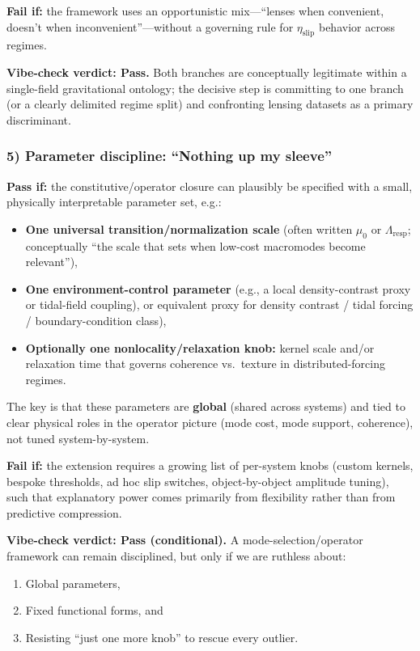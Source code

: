 \textbf{Fail if:} the framework uses an opportunistic mix---``lenses when convenient, doesn't 
when inconvenient''---without a governing rule for $\eta_{\text{slip}}$ behavior across regimes.

\checkmark \textbf{Vibe-check verdict: Pass.} Both branches are conceptually legitimate within 
a single-field gravitational ontology; the decisive step is committing to one branch (or a 
clearly delimited regime split) and confronting lensing datasets as a primary discriminant.

\subsubsection{5) Parameter discipline: ``Nothing up my sleeve''}

\textbf{Pass if:} the constitutive/operator closure can plausibly be specified with a small, 
physically interpretable parameter set, e.g.:
\begin{itemize}
  \item \textbf{One universal transition/normalization scale} (often written $\mu_0$ or 
    $\Lambda_{\text{resp}}$; conceptually ``the scale that sets when low-cost macromodes 
    become relevant''),
  
  \item \textbf{One environment-control parameter} (e.g., a local density-contrast proxy or 
    tidal-field coupling), or equivalent proxy for density contrast / tidal forcing / boundary-condition class),
  
  \item \textbf{Optionally one nonlocality/relaxation knob:} kernel scale and/or relaxation 
    time that governs coherence vs.\ texture in distributed-forcing regimes.
\end{itemize}

The key is that these parameters are \textbf{global} (shared across systems) and tied to 
clear physical roles in the operator picture (mode cost, mode support, coherence), not tuned 
system-by-system.

\textbf{Fail if:} the extension requires a growing list of per-system knobs (custom kernels, 
bespoke thresholds, ad hoc slip switches, object-by-object amplitude tuning), such that 
explanatory power comes primarily from flexibility rather than from predictive compression.

\checkmark \textbf{Vibe-check verdict: Pass (conditional).} A mode-selection/operator framework 
can remain disciplined, but only if we are ruthless about:
\begin{enumerate}
  \item Global parameters,
  \item Fixed functional forms, and
  \item Resisting ``just one more knob'' to rescue every outlier.
\end{enumerate}

